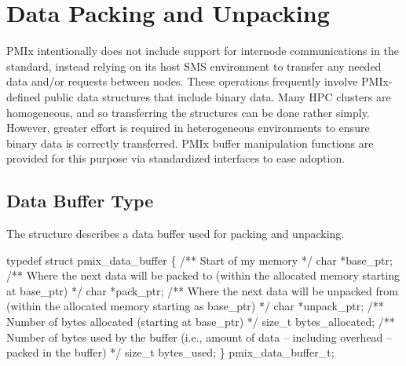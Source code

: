 \chapter{Data Packing and Unpacking}
\label{chap:api_data_mgmt}

\ac{PMIx} intentionally does not include support for internode communications in the standard, instead relying on its host \ac{SMS} environment to transfer any needed data and/or requests between nodes. These operations frequently involve PMIx-defined public data structures that include binary data. Many \ac{HPC} clusters are homogeneous, and so transferring the structures can be done rather simply. However, greater effort is required in heterogeneous environments to ensure binary data is correctly transferred. \ac{PMIx} buffer manipulation functions are provided for this purpose via standardized interfaces to ease adoption.

\section{Data Buffer Type}

The  structure describes a data buffer used for packing and unpacking.

\begin{signature}{2.0}
typedef struct pmix_data_buffer \{
\hspace*{4\sigspace}/** Start of my memory */
\hspace*{4\sigspace}char *base_ptr;
\hspace*{4\sigspace}/** Where the next data will be packed to
\hspace*{8\sigspace}(within the allocated memory starting
\hspace*{8\sigspace}at base_ptr) */
\hspace*{4\sigspace}char *pack_ptr;
\hspace*{4\sigspace}/** Where the next data will be unpacked
\hspace*{8\sigspace}from (within the allocated memory
\hspace*{8\sigspace}starting as base_ptr) */
\hspace*{4\sigspace}char *unpack_ptr;
\hspace*{4\sigspace}/** Number of bytes allocated (starting
\hspace*{8\sigspace}at base_ptr) */
\hspace*{4\sigspace}size_t bytes_allocated;
\hspace*{4\sigspace}/** Number of bytes used by the buffer
\hspace*{8\sigspace}(i.e., amount of data -- including
\hspace*{8\sigspace}overhead -- packed in the buffer) */
\hspace*{4\sigspace}size_t bytes_used;
\} pmix_data_buffer_t;
\end{signature}



